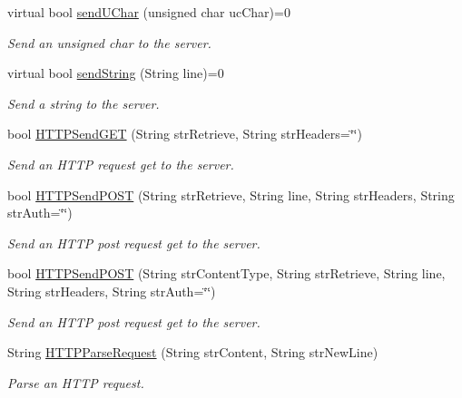 \begin{DoxyCompactItemize}
virtual bool \hyperlink{class_rad_jav_1_1_networking_1_1_tcpip_client_a9ae91c15920f4a5f205d1d9b1d0e57b4}{send\+U\+Char} (unsigned char uc\+Char)=0
\begin{DoxyCompactList}\small\item\em Send an unsigned char to the server. \end{DoxyCompactList}\item 
virtual bool \hyperlink{class_rad_jav_1_1_networking_1_1_tcpip_client_ad92a7dd6a9644df7429de0cd87c79314}{send\+String} (String line)=0
\begin{DoxyCompactList}\small\item\em Send a string to the server. \end{DoxyCompactList}\item 
bool \hyperlink{class_rad_jav_1_1_networking_1_1_tcpip_client_a954343f32588c0c613a0455116197db8}{H\+T\+T\+P\+Send\+G\+ET} (String str\+Retrieve, String str\+Headers=\char`\"{}\char`\"{})
\begin{DoxyCompactList}\small\item\em Send an H\+T\+TP request get to the server. \end{DoxyCompactList}\item 
bool \hyperlink{class_rad_jav_1_1_networking_1_1_tcpip_client_a690fc920a76bf4e3749207f929cea267}{H\+T\+T\+P\+Send\+P\+O\+ST} (String str\+Retrieve, String line, String str\+Headers, String str\+Auth=\char`\"{}\char`\"{})
\begin{DoxyCompactList}\small\item\em Send an H\+T\+TP post request get to the server. \end{DoxyCompactList}\item 
bool \hyperlink{class_rad_jav_1_1_networking_1_1_tcpip_client_a3db51914091c0452d2417ef2167342c0}{H\+T\+T\+P\+Send\+P\+O\+ST} (String str\+Content\+Type, String str\+Retrieve, String line, String str\+Headers, String str\+Auth=\char`\"{}\char`\"{})
\begin{DoxyCompactList}\small\item\em Send an H\+T\+TP post request get to the server. \end{DoxyCompactList}\item 
String \hyperlink{class_rad_jav_1_1_networking_1_1_tcpip_client_a7baff1a0a5f62e3ed4dbed3d9ee24205}{H\+T\+T\+P\+Parse\+Request} (String str\+Content, String str\+New\+Line)
\begin{DoxyCompactList}\small\item\em Parse an H\+T\+TP request. \end{DoxyCompactList}\item 

\end{DoxyCompactItemize}
